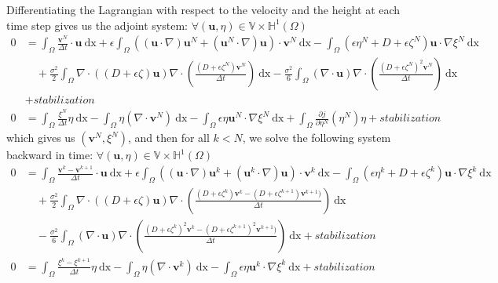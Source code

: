 \documentclass[11pt,a4paper]{article}
\begin{document}
		Differentiating the Lagrangian with respect to the velocity and the height at each time step gives us the adjoint system: $\forall (\mathbf{u},\eta) \in \mathbb{V} \times \mathbb{H}^1(\Omega)$		
		\begin{equation}
			\begin{split}
				0 & = \int_{\Omega} \! \frac{\mathbf{v}^{N}}{\Delta t} \cdot	\mathbf{u} \: \mathrm{dx} + \epsilon \int_{\Omega} \! ((\mathbf{u} \cdot \nabla )\mathbf{u}^N + (\mathbf{u}^N \cdot \nabla )\mathbf{u}) \cdot 	\mathbf{v}^{N} \: \mathrm{dx} 	- \int_{\Omega} \! (\epsilon \eta^N + D + \epsilon \zeta^N) \mathbf{u} \cdot \nabla \xi^N \: \mathrm{dx} \\
				&\quad + \frac{\sigma^2}{2} \int_{\Omega} \! \nabla \cdot ((D + \epsilon \zeta) \mathbf{u})  \nabla \cdot \left(\frac{(D+ \epsilon \zeta^N)\mathbf{v}^N}{\Delta t}\right) \: \mathrm{dx} - \frac{\sigma^2}{6} \int_{\Omega} \! (\nabla \cdot \mathbf{u})  \nabla \cdot \left(\frac{(D+ \epsilon \zeta^N)^2 \mathbf{v}^N}{\Delta t}\right) \: \mathrm{dx} \\
				& + stabilization \\
				0 & = \int_{\Omega} \! \frac{\xi^{N}}{\Delta t} \eta \: \mathrm{dx} - \int_{\Omega} \! \eta (\nabla \cdot \mathbf{v}^N) \: \mathrm{dx} - \int_{\Omega} \! \epsilon \eta \mathbf{u}^N \cdot \nabla \xi^N \: \mathrm{dx} + \int_{\Omega} \! \frac{\partial j}{\partial \eta^N}(\eta^N) \eta + stabilization
			\end{split}			
		\end{equation}
		which gives us $(\mathbf{v}^N, \xi^N)$, and then for all $k<N$, we solve the following system backward in time: $\forall (\mathbf{u},\eta) \in \mathbb{V} \times \mathbb{H}^1(\Omega)$ 
		\begin{equation}
			\begin{split}
				0 & = \int_{\Omega} \! \frac{\mathbf{v}^{k} - \mathbf{v}^{k+1}}{\Delta t} \cdot	\mathbf{u} \: \mathrm{dx} + \epsilon \int_{\Omega} \! ((\mathbf{u} \cdot \nabla )\mathbf{u}^k + (\mathbf{u}^k \cdot \nabla )\mathbf{u}) \cdot 	\mathbf{v}^{k} \: \mathrm{dx} 	- \int_{\Omega} \! (\epsilon \eta^k + D + \epsilon \zeta^k) \mathbf{u} \cdot \nabla \xi^k \: \mathrm{dx} \\
				&\quad + \frac{\sigma^2}{2} \int_{\Omega} \! \nabla \cdot ((D + \epsilon \zeta) \mathbf{u})  \nabla \cdot \left(\frac{(D+ \epsilon \zeta^k)\mathbf{v}^k - (D + \epsilon \zeta^{k+1})\mathbf{v}^{k+1})}{\Delta t}\right) \: \mathrm{dx} \\
				&\quad - \frac{\sigma^2}{6} \int_{\Omega} \! (\nabla \cdot \mathbf{u})  \nabla \cdot \left(\frac{(D+ \epsilon \zeta^k)^2 \mathbf{v}^k - (D + \epsilon \zeta^{k+1})^2 \mathbf{v}^{k+1})}{\Delta t}\right) \: \mathrm{dx} + stabilization \\
				0 & = \int_{\Omega} \! \frac{\xi^{k} - \xi^{k+1}}{\Delta t} \eta \: \mathrm{dx} - \int_{\Omega} \! \eta (\nabla \cdot \mathbf{v}^k) \: \mathrm{dx} - \int_{\Omega} \! \epsilon \eta \mathbf{u}^k \cdot \nabla \xi^k \: \mathrm{dx} + stabilization
			\end{split}			
		\end{equation}
\end{document}
